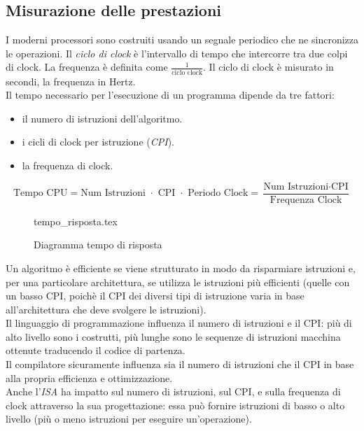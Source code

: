 \documentclass[class=book, crop=false]{standalone}
\begin{document}
\subsection{Misurazione delle prestazioni}
I moderni processori sono costruiti usando un segnale periodico che ne sincronizza le operazioni. Il \emph{ciclo di clock} è l’intervallo di tempo che intercorre tra due colpi di clock. La frequenza è definita come $\frac{1}{\text{ciclo clock}}$. Il ciclo di clock è misurato in secondi, la frequenza in Hertz.\\

Il tempo necessario per l'esecuzione di un programma dipende da tre fattori:
\begin{itemize}[nolistsep]
	\item il numero di istruzioni dell'algoritmo.
	\item i cicli di clock per istruzione (\emph{CPI}).
	\item la frequenza di clock.
\end{itemize}
\begin{equation*}
\text{Tempo CPU} = \text{Num Istruzioni } \cdot \text{ CPI } \cdot \text{ Periodo Clock} = \frac{\text{Num Istruzioni} \cdot \text{CPI}}{\text{Frequenza Clock}}
\end{equation*}

\begin{figure}[H]
	\centering
	{tempo_risposta.tex}
	\caption{Diagramma tempo di risposta}
\end{figure}

Un algoritmo è efficiente se viene strutturato in modo da risparmiare istruzioni e, per una particolare architettura, se utilizza le istruzioni più efficienti (quelle con un basso CPI, poichè il CPI dei diversi tipi di istruzione varia in base all'architettura che deve svolgere le istruzioni).\\
Il linguaggio di programmazione influenza il numero di istruzioni e il CPI: più di alto livello sono i costrutti, più lunghe sono le sequenze di istruzioni macchina ottenute traducendo il codice di partenza.\\
Il compilatore sicuramente influenza sia il numero di istruzioni che il CPI in base alla propria efficienza e ottimizzazione.\\
Anche l'\emph{ISA} ha impatto sul numero di istruzioni, sul CPI, e sulla frequenza di clock attraverso la sua progettazione: essa può fornire istruzioni di basso o alto livello (più o meno istruzioni per eseguire un'operazione).
\end{document}

